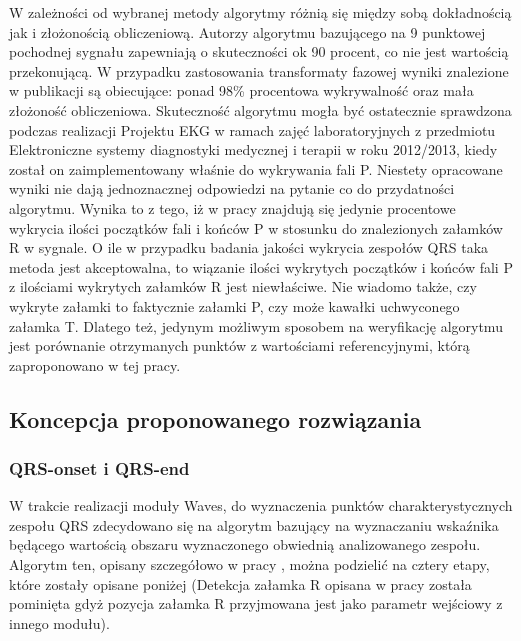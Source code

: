W zależności od wybranej metody algorytmy różnią się między sobą dokładnością jak i złożonością obliczeniową. Autorzy algorytmu bazującego na 9 punktowej pochodnej sygnału \cite{Waves_ANAfPDitES} zapewniają o skuteczności ok 90 procent, co nie jest wartością przekonującą. W przypadku zastosowania transformaty fazowej wyniki znalezione w publikacji \cite{Waves_aNMfADoEFPBotPT} są obiecujące: ponad 98\% procentowa wykrywalność oraz mała złożoność obliczeniowa. Skuteczność algorytmu mogła być ostatecznie sprawdzona podczas realizacji Projektu EKG \cite{Waves_ProjZeszlyRok} w ramach zajęć laboratoryjnych z przedmiotu Elektroniczne systemy diagnostyki medycznej i terapii w roku 2012/2013, kiedy został on zaimplementowany właśnie do wykrywania fali P. Niestety opracowane wyniki nie dają jednoznacznej odpowiedzi na pytanie co do przydatności algorytmu. Wynika to z tego, iż w pracy \cite{Waves_ProjZeszlyRok} znajdują się jedynie procentowe wykrycia ilości początków fali i końców P  w stosunku do znalezionych załamków R w sygnale. O ile w przypadku badania jakości wykrycia zespołów QRS taka metoda jest akceptowalna, to wiązanie ilości wykrytych początków i końców fali P z ilościami wykrytych załamków R jest niewłaściwe. Nie wiadomo także, czy wykryte załamki to faktycznie załamki P, czy może kawałki uchwyconego załamka T. Dlatego też, jedynym możliwym sposobem na weryfikację algorytmu jest porównanie otrzymanych punktów z wartościami referencyjnymi, którą zaproponowano w tej pracy.

\subsection{Koncepcja proponowanego rozwiązania}

\subsubsection{QRS-onset i QRS-end}

W trakcie realizacji moduły Waves, do wyznaczenia punktów charakterystycznych zespołu QRS zdecydowano się na algorytm bazujący na wyznaczaniu wskaźnika będącego wartością obszaru wyznaczonego obwiednią analizowanego zespołu. Algorytm ten, opisany szczegółowo w pracy \cite{Waves_QRSAlg} , można podzielić na cztery etapy, które zostały opisane poniżej (Detekcja załamka R opisana w pracy \cite{Waves_QRSAlg} została pominięta gdyż pozycja załamka R przyjmowana jest jako parametr wejściowy z innego modułu). 

